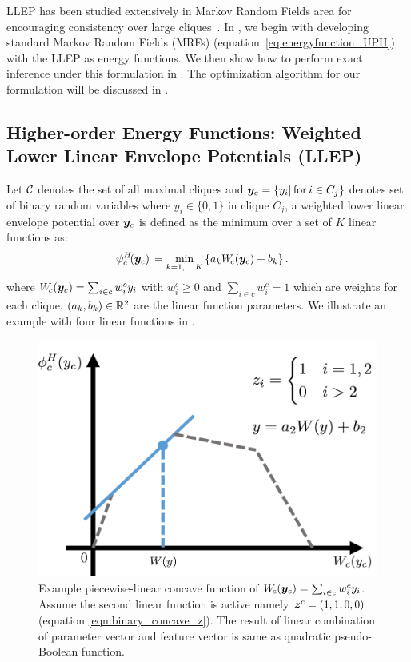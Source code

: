 LLEP has been studied extensively in Markov Random Fields area
for encouraging consistency over large
cliques~\cite{Kohli:CVPR07,Nowozin:2011,Gould:ICML2011}. In
, we begin with developing standard Markov
Random Fields (MRFs) (equation~\eqref{eq:energyfunction_UPH})
with the LLEP as energy functions. We then show how to perform
exact inference under this formulation in
. The optimization algorithm for our
formulation will be discussed in .

\subsection{Higher-order Energy Functions: Weighted Lower Linear
  Envelope Potentials (LLEP)}
\label{sec:llep}

Let $\cal C$ denotes the set of all maximal cliques
and ${\bm{y}}_c=\{y_i |\text{\,for\,} i \in C_j\}$ denotes set of
binary random variables where $y_i\in \{0,1\}$ in clique $C_j$, a
weighted lower linear envelope potential over ${\bm{y}}_c$ is defined
as the minimum over a set of $K$ linear functions as:
%
\begin{align}
  \psi^H_c\!({\bm{y}}_c) \, &= \min_{k=1, \ldots, K} \left\{ a_k W_{\!c}({\bm{y}}_c) + b_k \right\}.
  \label{eqn:potential2}
\end{align}
%
where $W_{\!c}({\bm{y}}_c) = \sum_{i \in c} w_i^c y_i$ with $w^c_i
\geq 0$ and $\sum_{i \in c} w^c_i = 1$ which are weights for each
clique. $(a_k, b_k) \in {\mathbb{R}}^2$ are the linear function
parameters. We illustrate an example with four linear functions
in .

\begin{figure}[t]
  \centering
  \includegraphics[width=0.8\columnwidth]{Part2/figures/linEnvLatentFig.png}
  \caption{\label{fig:concave} Example piecewise-linear concave
    function of $W_{\!c}({\bm{y}}_c) = \sum_{i \in c} w^c_i y_i$.
    Assume the second linear function is active namely
    ${\bm{z}}^c=(1,1,0,0)$ (equation \ref{eqn:binary_concave_z}). The result of linear combination of
    parameter vector and feature vector is same as quadratic
    pseudo-Boolean function.}
\end{figure}

